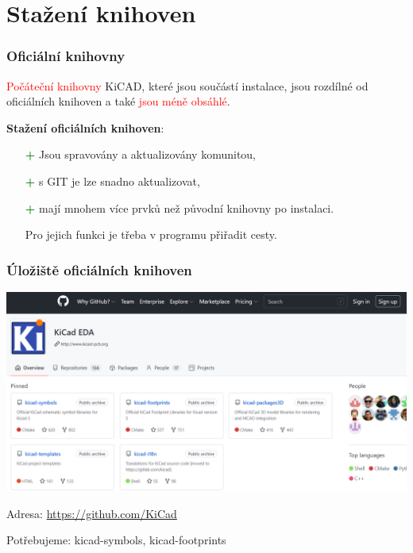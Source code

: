 \documentclass{beamer}
\begin{document}
\section{\texorpdfstring{Stažení knihoven}{Stazeni knihoven}}
	\begin{frame}
    \frametitle{Oficiální knihovny}
   
    \textcolor{red}{Počáteční knihovny} KiCAD, které jsou součástí instalace, jsou rozdílné od oficiálních knihoven a také \textcolor{red}{jsou méně obsáhlé}.
    \vspace{0.5 cm}
		
		\textbf{Stažení oficiálních knihoven}:
		\begin{itemize}
			\item[\textcolor{green}{\textbf{+}}] Jsou spravovány a aktualizovány komunitou,
			\item[\textcolor{green}{\textbf{+}}] s GIT je lze snadno aktualizovat,
			\item[\textcolor{green}{\textbf{+}}] mají mnohem více prvků než původní knihovny po instalaci.
			\item[\textcolor{red}{\textbf{\text{--}}}] Pro jejich funkci je třeba v programu přiřadit cesty.
		\end{itemize}
	\end{frame}
	\begin{frame}
    \frametitle{Úložiště oficiálních knihoven}

    \begin{center}
			\includegraphics[scale=0.3]{obr/github_lib1.png}
		\end{center}
		
		Adresa: \url{https://github.com/KiCad}
		
		Potřebujeme: kicad-symbols, kicad-footprints
		
	\end{frame}
\end{document}
